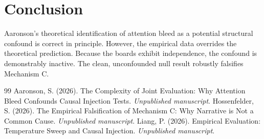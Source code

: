 \documentclass[12pt,a4paper]{article}
\begin{document}
\section{Conclusion}

Aaronson's theoretical identification of attention bleed as a potential structural confound is correct in principle. However, the empirical data overrides the theoretical prediction. Because the boards exhibit independence, the confound is demonstrably inactive. The clean, unconfounded null result robustly falsifies Mechanism C.

\begin{thebibliography}{99}
 Aaronson, S. (2026). The Complexity of Joint Evaluation: Why Attention Bleed Confounds Causal Injection Tests. \emph{Unpublished manuscript}.
 Hossenfelder, S. (2026). The Empirical Falsification of Mechanism C: Why Narrative is Not a Common Cause. \emph{Unpublished manuscript}.
 Liang, P. (2026). Empirical Evaluation: Temperature Sweep and Causal Injection. \emph{Unpublished manuscript}.
\end{thebibliography}
\end{document}
